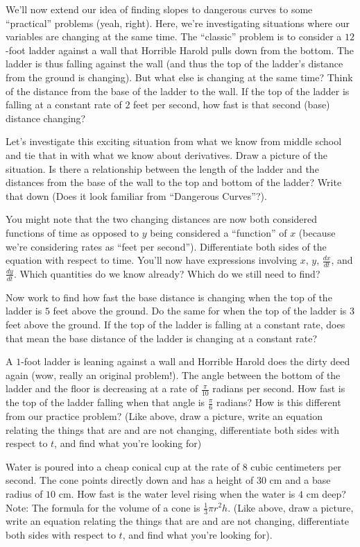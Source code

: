 \documentclass[handout]{ximera}
\begin{document}
\begin{exercise} 
We'll now extend our idea of finding slopes to dangerous curves to some ``practical'' problems (yeah, right).  Here, we're investigating situations where our variables are changing at the same time.  The ``classic'' problem is to consider a $12$-foot ladder against a wall that Horrible Harold pulls down from the bottom. The ladder is thus falling against the wall (and thus the top of the ladder's distance from the ground is changing).  But what else is changing at the same time?  Think of the distance from the base of the ladder to the wall.  If the top of the ladder is falling at a constant rate of $2$ feet per second, how fast is that second (base) distance changing? 

Let's investigate this exciting situation from what we know from middle school and tie that in with what we know about derivatives.  Draw a picture of the situation.  Is there a relationship between the length of the ladder and the distances from the base of the wall to the top and bottom of the ladder?  Write that down (Does it look familiar from ``Dangerous Curves''?).  

You might note that the two changing distances are now both considered functions of time as opposed to $y$ being considered a ``function'' of $x$ (because we're considering rates as ``feet per second'').  Differentiate both sides of the equation with respect to time.  You'll now have expressions involving $x$, $y$, $\frac{dx}{dt}$, and $\frac{dy}{dt}$.  Which quantities do we know already?  Which do we still need to find? 

Now work to find how fast the base distance is changing when the top of the ladder is $5$ feet above the ground.  Do the same for when the top of the ladder is $3$ feet above the ground.  If the top of the ladder is falling at a constant rate, does that mean the base distance of the ladder is changing at a constant rate?
\end{exercise} 
\begin{exercise} 
A $1$-foot ladder is leaning against a wall and Horrible Harold does the dirty deed again (wow, really an original problem!).  The angle between the bottom of the ladder and the floor is decreasing at a rate of $\frac{\pi}{10}$  radians per second.  How fast is the top of the ladder falling when that angle is  $\frac{\pi}{6}$ radians?  How is this different from our practice problem?   (Like above, draw a picture, write an equation relating the things that are and are not changing, differentiate both sides with respect to $t$, and find what you're looking for)
\end{exercise}
\begin{exercise}
Water is poured into a cheap conical cup at the rate of $8$ cubic centimeters per second.  The cone points directly down and has a height of $30$ cm and a base radius of $10$ cm.  How fast is the water level rising when the water is $4$ cm deep?  Note:  The formula for the volume of a cone is  $\frac{1}{3}\pi r^2 h$. (Like above, draw a picture, write an equation relating the things that are and are not changing, differentiate both sides with respect to $t$, and find what you’re looking for).
\end{exercise}
\end{document}
